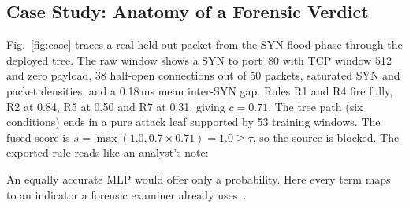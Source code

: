 \documentclass[conference]{IEEEtran}
\begin{document}
\subsection{Case Study: Anatomy of a Forensic Verdict}
\label{sec:case}
Fig.~\ref{fig:case} traces a real held-out packet from the SYN-flood phase through the deployed tree. The raw window shows a SYN to port~80 with TCP window 512 and zero payload, 38 half-open connections out of 50 packets, saturated SYN and packet densities, and a 0.18\,ms mean inter-SYN gap. Rules R1 and R4 fire fully, R2 at 0.84, R5 at 0.50 and R7 at 0.31, giving $c=0.71$. The tree path (six conditions) ends in a pure attack leaf supported by 53 training windows. The fused score is $s=\max(1.0,0.7\times0.71)=1.0\ge\tau$, so the source is blocked. The exported rule reads like an analyst's note:

\smallskip
\noindent{}
\smallskip

\noindent An equally accurate MLP would offer only a probability. Here every term maps to an indicator a forensic examiner already uses~\cite{naing2023}.
\end{document}
